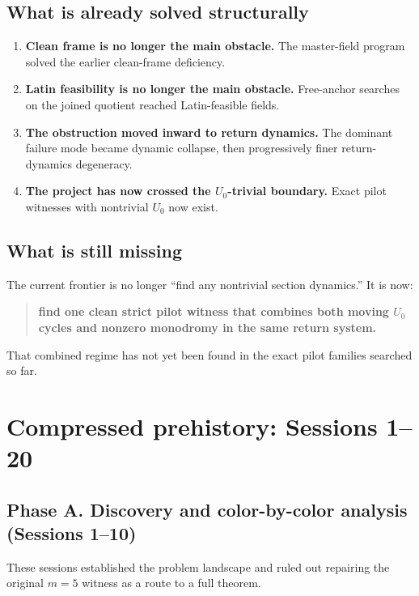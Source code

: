 \documentclass[11pt]{article}
\begin{document}
\subsection*{What is already solved structurally}

\begin{enumerate}
    \item \textbf{Clean frame is no longer the main obstacle.} The master-field program solved the earlier clean-frame deficiency.
    \item \textbf{Latin feasibility is no longer the main obstacle.} Free-anchor searches on the joined quotient reached Latin-feasible fields.
    \item \textbf{The obstruction moved inward to return dynamics.} The dominant failure mode became dynamic collapse, then progressively finer return-dynamics degeneracy.
    \item \textbf{The project has now crossed the $U_0$-trivial boundary.} Exact pilot witnesses with nontrivial $U_0$ now exist.
\end{enumerate}

\subsection*{What is still missing}

The current frontier is no longer ``find any nontrivial section dynamics.'' It is now:

\begin{quote}
\textbf{find one clean strict pilot witness that combines both moving $U_0$ cycles and nonzero monodromy in the same return system.}
\end{quote}

That combined regime has not yet been found in the exact pilot families searched so far.

\section*{Compressed prehistory: Sessions 1--20}

\subsection*{Phase A. Discovery and color-by-color analysis (Sessions 1--10)}

These sessions established the problem landscape and ruled out repairing the original $m=5$ witness as a route to a full theorem.
\end{document}
